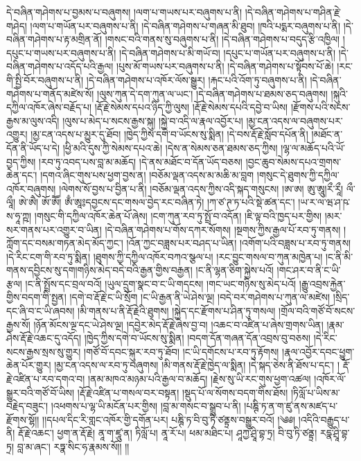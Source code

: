 དེ་བཞིན་གཤེགས་པ་བྱམས་པ་བཞུགས། །ལག་པ་གཡས་པར་བཞུགས་པ་ནི། །དེ་བཞིན་གཤེགས་པ་གཤིན་རྗེ་གཤེད། །ལག་པ་གཡོན་པར་བཞུགས་པ་ནི། །དེ་བཞིན་གཤེགས་པ་གཞན་མི་ཐུབ། །ཁའི་པདྨར་བཞུགས་པ་ནི། །དེ་བཞིན་གཤེགས་པ་རྟ་མགྲིན་ནོ། །གསང་བའི་གནས་སུ་བཞུགས་པ་ནི། །དེ་བཞིན་གཤེགས་པ་བདུད་རྩི་འཁྱིལ། །དཔུང་པ་གཡས་པར་བཞུགས་པ་ནི། །དེ་བཞིན་གཤེགས་པ་མི་གཡོ་བ། །དཔུང་པ་གཡོན་པར་བཞུགས་པ་ནི། །དེ་བཞིན་གཤེགས་པ་འདོད་པའི་རྒྱལ། །པུས་མོ་གཡས་པར་བཞུགས་པ་ནི། །དེ་བཞིན་གཤེགས་པ་སྟོབས་པོ་ཆེ། །རང་གི་སྤྱི་བོར་བཞུགས་པ་ནི། །དེ་བཞིན་གཤེགས་པ་འཁོར་ལོས་སྒྱུར། །རྐང་པའི་འོག་ཏུ་བཞུགས་པ་ནི། །དེ་བཞིན་གཤེགས་པ་གནོད་མཛེས་སོ། །ལུས་ཀུན་དེ་དག་ཀུན་ལ་ཡང་། །དེ་བཞིན་གཤེགས་པ་ཐམས་ཅད་བཞུགས། །སྐུའི་དཀྱིལ་འཁོར་ཞེས་བརྗོད་པ། །རྡོ་རྗེ་སེམས་དཔའ་ཉིད་ཀྱི་ལུས། །རྡོ་རྗེ་སེམས་དཔའི་དབྱེ་བ་ཡིས། །རྫོགས་པའི་སངས་རྒྱས་མ་ལུས་འདི། །ལུས་པ་མེད་པ་སངས་རྒྱས་སྐུ། །སྐྱེ་བ་འདི་ལ་རྣལ་འབྱོར་པ། །མྱ་ངན་འདས་ལ་བཞུགས་པར་འགྱུར། །མྱ་ངན་འདས་པ་མྱུར་དུ་ཐོབ། །ཁྱེད་ཀྱིས་དགེ་བ་ཡོངས་སུ་སྨིན། །དེ་བས་རྡོ་རྗེ་སློབ་དཔོན་ནི། །མཐོང་ན་དོན་ནི་ཡོད་པ་དེ། །ཕྱི་མའི་དུས་ཀྱི་སེམས་དཔའ་ཆེ། །དེས་ན་སེམས་ཅན་ཐམས་ཅད་ཀྱིས། །ལྷ་ལ་མཆོད་པའི་ཡོ་བྱད་ཀྱིས། །རབ་ཏུ་འབད་པས་བླ་མ་མཆོད། །དེ་ནས་མཐོང་བ་དོན་ཡོད་བཅས། །བྱང་ཆུབ་སེམས་དཔའ་གྲགས་ཆེན་དང་། །དགའ་ཞིང་གུས་པས་ཕྱག་བྱས་ན། །བཅོམ་ལྡན་འདས་མ་མཆི་མ་བླག །གསུང་དེ་ཐུགས་ཀྱི་དཀྱིལ་འཁོར་བཞུགས། །ལེགས་སོ་བྱས་པ་བྱིན་པ་ནི། །བཅོམ་ལྡན་འདས་ཀྱིས་འདི་སྐད་གསུངས། །ཨ་ཨ། ཨུ་ཨཱུ།རྀ་རཱྀ། ལྀ་ལཱྀ། ཨེ་ཨཻ། ཨོ་ཨཽ། ཨྃ་ཨཱ༔དབྱངས་དང་གསལ་བྱེད་རང་བཞིན་ཏེ། །ཀ་ཙ་ཊ་ཏ་པའི་སྡེ་ཚན་དང་། །ཡ་ར་ལ་ཝ་ཤ་ཥ་ས་ཧཱ་ཀྵ། །གསུང་གི་དཀྱིལ་འཁོར་ཆེན་པོ་ཞེས། །ངག་ཀུན་རབ་ཏུ་སྤྲོ་བ་འདོན། །ཇི་ལྟ་བའི་ཁྱད་པར་གྱིས། །མར་སར་གནས་པར་འགྱུར་བ་ཡིན། །དེ་བཞིན་གཤེགས་པ་གོས་དཀར་སོགས། །སྔགས་ཀྱིས་རྒྱལ་པོ་རབ་ཏུ་གནས། །
ཀློག་དང་བསམ་གཏན་མེད་མོད་ཀྱང་། །འོན་ཀྱང་བཟླས་པར་བཤད་པ་ཡིན། །འགོག་པའི་བཟླས་པ་རབ་ཏུ་གནས། །དེ་རིང་ངག་གི་རབ་ཏུ་སྨིན། །ཐུགས་ཀྱི་དཀྱིལ་འཁོར་བཀའ་སྩལ་པ། །རང་བྱུང་གསལ་བ་ཀུན་མཁྱེན་པ། །ང་ནི་མི་གནས་དབྱིངས་སུ་དག།གཉིས་མེད་བདེ་བའི་རྒྱན་གྱིས་བརྒྱན། །ང་ནི་ལྷན་ཅིག་སྐྱེས་པའོ། །གང་ཤར་བ་ནི་ང་ཡི་རྩལ། །ང་ནི་སྤྲོས་དང་བྲལ་བའོ། །ཡུལ་དྲུག་སྣང་བ་ང་ཡི་གདངས། །གང་ཡང་གཉིས་སུ་མེད་པའོ། །རྒྱུ་འབྲས་རྐྱེན་གྱིས་བདག་གི་སྤྱན། །དགེ་བ་རྡོ་རྗེ་ང་ཡི་སྲོག །ང་ཡི་རྒྱན་ནི་ཡེ་ཤེས་ལྔ། །བདེ་བར་གཤེགས་པ་ཀུན་ལ་མཛེས། །སྲིད་དང་ཞི་བ་ང་ཡི་ཞབས། །མི་གནས་པ་ནི་རྡོ་རྗེའི་ཐུགས། །སྐྱེད་དང་རྫོགས་པ་ཤིན་ཏུ་གསལ། །གྲོལ་བའི་གཙོ་བོ་སངས་རྒྱས་སོ། །ཉོན་མོངས་ལྔ་དང་ཡེ་ཤེས་ལྔ། །དབྱེར་མེད་རྡོ་རྗེ་ཞེས་བྱ་བ། །འཆང་བ་འཛིན་པ་ཞེས་གྲགས་ཡིན། །རྣམ་ཤེས་རྡོ་རྗེ་འཆང་དུ་འདོད། །ཁྱེད་ཀྱིས་དགེ་བ་ཡོངས་སུ་སྨིན། །བདག་དོན་གཞན་དོན་འབྲས་བུ་བཅས། །དེ་རིང་སངས་རྒྱས་སྲས་སུ་གྱུར། །གཙོ་བོ་དབང་སྐུར་རབ་ཏུ་ཐོབ། །ང་ཡི་དགོངས་པ་རབ་ཏུ་རྟོགས། །རྣལ་འབྱོར་དབང་ཕྱུག་ཆེན་པོར་གྱུར། །མྱ་ངན་འདས་ལ་རབ་ཏུ་བཞུགས། །མི་གནས་རྡོ་རྗེ་ཁྱེད་ལ་སྨིན། །དེ་སྐད་ཅེས་ནི་ཐོས་པ་དང་། ། རྡོ་རྗེ་འཛིན་པ་རབ་དགའ་བ། །ནམ་མཁའ་མཉམ་པའི་རྒྱལ་བ་མཆོད། །རྗེས་སུ་ཡི་རང་གུས་ཕྱག་འཚལ། །འཁོར་ལོ་སྒྱུར་བའི་གཙོ་བོ་ཡིས། །རྡོ་རྗེ་འཛིན་པ་གསལ་བར་བསྟན། །སྡུད་པོ་ལ་སོགས་བདག་གིས་ཐོས། །ཏིལློ་པ་ཡིས་མ་བརྗེད་བཟུང་། །འཕགས་པ་ལྷ་ཡི་མངོན་པར་གྱིས། །བླ་མ་གསང་བ་སྒྲུབ་པ་ནི། །པཎྚི་ཏ་ན་ག་ཛུ་ནས་མཛད་པ་རྫོགས་སྷོ།། །།དཔལ་དིང་རི་གླང་འཁོར་གྱི་དགོན་པར། པཎྚི་ཏ་བི་བུ་ཏི་ཙནྟྲས་བསྒྱུར་བའོ། །༄༅། །འདིའི་བརྒྱུད་པ་ནི། རྡོ་རྗེ་འཆང་། ཕྱག་ན་རྡོ་རྗེ། ནཱ་ག་ཛཱུ་ན། ཏིལློ་པ། ནཱ་རོ་པ། ཕམ་མཐིང་པ། ཤཱཀྱ་ཤྲཱི་བྷ་ཏྲ། བི་བུ་ཏི་ཙནྟྲ། རདྣ་ཤྲཱི་བྷ་ཏྲ། བླ་མ་ཞང་། རཏྣ་སིང་ཧ་རྣམས་སོ།། །།